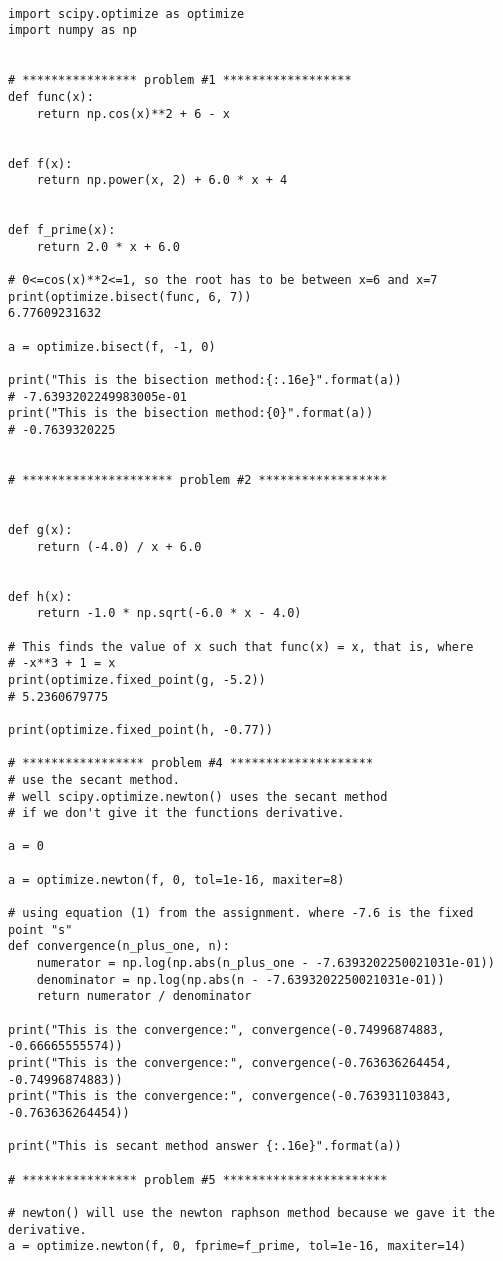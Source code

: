 \documentclass[12pt letterpaper]{article}
\begin{document}
\begin{verbatim}

import scipy.optimize as optimize
import numpy as np


# **************** problem #1 ******************
def func(x):
    return np.cos(x)**2 + 6 - x


def f(x):
    return np.power(x, 2) + 6.0 * x + 4


def f_prime(x):
    return 2.0 * x + 6.0

# 0<=cos(x)**2<=1, so the root has to be between x=6 and x=7
print(optimize.bisect(func, 6, 7))
6.77609231632

a = optimize.bisect(f, -1, 0)

print("This is the bisection method:{:.16e}".format(a))
# -7.6393202249983005e-01
print("This is the bisection method:{0}".format(a))
# -0.7639320225


# ********************* problem #2 ******************


def g(x):
    return (-4.0) / x + 6.0


def h(x):
    return -1.0 * np.sqrt(-6.0 * x - 4.0)

# This finds the value of x such that func(x) = x, that is, where
# -x**3 + 1 = x
print(optimize.fixed_point(g, -5.2))
# 5.2360679775

print(optimize.fixed_point(h, -0.77))

# ***************** problem #4 ********************
# use the secant method.
# well scipy.optimize.newton() uses the secant method 
# if we don't give it the functions derivative.

a = 0

a = optimize.newton(f, 0, tol=1e-16, maxiter=8)

# using equation (1) from the assignment. where -7.6 is the fixed point "s"
def convergence(n_plus_one, n): 
    numerator = np.log(np.abs(n_plus_one - -7.6393202250021031e-01))
    denominator = np.log(np.abs(n - -7.6393202250021031e-01))
    return numerator / denominator

print("This is the convergence:", convergence(-0.74996874883, -0.66665555574))
print("This is the convergence:", convergence(-0.763636264454, -0.74996874883))
print("This is the convergence:", convergence(-0.763931103843, -0.763636264454))

print("This is secant method answer {:.16e}".format(a))

# **************** problem #5 ***********************

# newton() will use the newton raphson method because we gave it the derivative.
a = optimize.newton(f, 0, fprime=f_prime, tol=1e-16, maxiter=14)


\end{verbatim}
\end{document}
